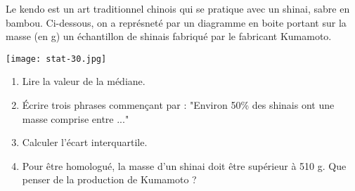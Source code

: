 
Le kendo est un art traditionnel chinois qui se pratique avec un shinai, sabre en bambou. Ci-dessous, on a représneté par un diagramme en boite portant sur la masse (en g) un échantillon de shinais fabriqué par le fabricant Kumamoto.

\begin{center}
\texttt{[image: stat-30.jpg]}
\end{center}


\begin{enumerate}
\item Lire la valeur de la médiane.
\item Écrire trois phrases commençant par : "Environ 50\% des shinais ont une masse comprise entre ..."
\item Calculer l'écart interquartile.
\item Pour être homologué, la masse d'un shinai doit être supérieur à 510 g. Que penser de la production de Kumamoto ?
\end{enumerate} 